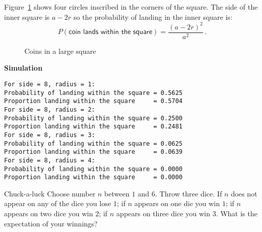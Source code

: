  Figure~\ref{f.coins2} shows four circles inscribed in the corners of the square. The side of the inner square is $a-2r$ so the probability of landing in the inner square is:
\[
P(\textsf{coin lands within the square})=\frac{(a-2r)^2}{a^2}\,.
\]
\begin{figure}[tb]
\begin{center}
\end{center}
\caption{Coins in a large square}\label{f.coins2}
\end{figure}

\textbf{Simulation}
\begin{verbatim}
For side = 8, radius = 1:
Probability of landing within the square = 0.5625
Proportion landing within the square     = 0.5704
For side = 8, radius = 2:
Probability of landing within the square = 0.2500
Proportion landing within the square     = 0.2481
For side = 8, radius = 3:
Probability of landing within the square = 0.0625
Proportion landing within the square     = 0.0639
For side = 8, radius = 4:
Probability of landing within the square = 0.0000
Proportion landing within the square     = 0.0000
\end{verbatim}


\begin{prob}{Chuck-a-luck}
Choose number $n$ between $1$ and $6$. Throw three dice. If $n$ does not appear on any of the dice you lose $1$; if $n$ appears on one die you win $1$; if $n$ appears on two dice you win $2$; if $n$ appears on three dice you win $3$. What is the expectation of your winnings?
\end{prob}

